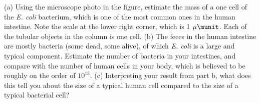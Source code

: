 (a) Using the microscope photo in the figure, estimate the mass of a one cell of the
\emph{E. coli} bacterium, which is one of the most common ones in the human
intestine. Note the scale at the lower right corner, which is 1 $\mu\munit$. Each of
the tubular objects in the column is one cell.
(b) The feces in the human intestine are mostly bacteria (some dead, some alive),
of which \emph{E. coli} is a large and typical component. Estimate the number of bacteria
in your intestines, and compare with the number of human cells in your body, which is
believed to be roughly on the order of $10^{13}$. (c) Interpreting your result from part b,
what does this tell you about the size of a typical human cell compared to the size of
a typical bacterial cell?
